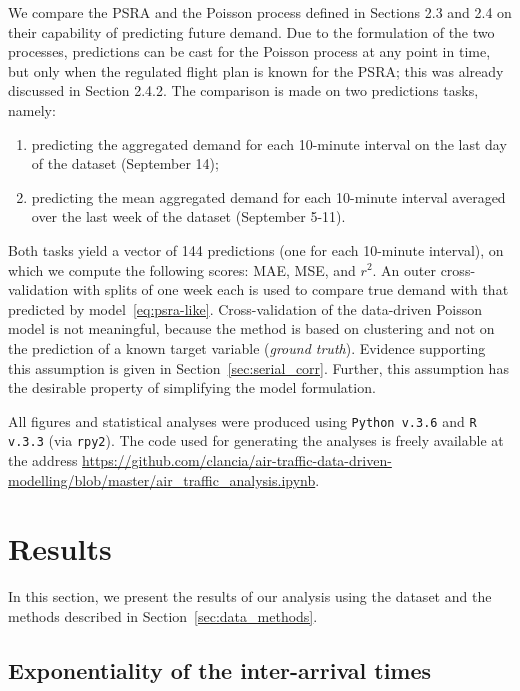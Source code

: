 \documentclass[draft,review]{elsarticle}
\begin{document}
We compare the \ac{PSRA} and the Poisson process defined in Sections 2.3 and 2.4 on their capability of predicting future demand. Due to the formulation of the two processes, predictions can be cast for the Poisson process at any point in time, but only when the regulated flight plan is known for the \ac{PSRA}; this was already discussed in Section 2.4.2.
The comparison is made on two predictions tasks, namely:
\begin{enumerate}
  \item predicting the aggregated demand for each 10-minute interval on the last day of the dataset (September 14);
  \item predicting the mean aggregated demand for each 10-minute interval averaged over the last week of the dataset (September 5-11).
\end{enumerate}
Both tasks yield a vector of 144 predictions (one for each 10-minute interval), on which we compute the following scores: \ac{MAE}, \ac{MSE}, and \(r^2\).
An outer cross-validation with splits of one week each is used to compare true demand with that predicted by model~\eqref{eq:psra-like}.
Cross-validation of the data-driven Poisson model is not meaningful, because the method is based on clustering and not on the prediction of a known target variable (\emph{ground truth}).
Evidence supporting this assumption is given in Section~\ref{sec:serial_corr}.
Further, this assumption has the desirable property of simplifying the model formulation.

All figures and statistical analyses were produced using \texttt{Python v.3.6} and \texttt{R v.3.3} (via \texttt{rpy2}). The code used for generating the analyses is freely available at the address \url{https://github.com/clancia/air-traffic-data-driven-modelling/blob/master/air_traffic_analysis.ipynb}.

\section{Results}\label{sec:results}

In this section, we present the results of our analysis using the dataset and the methods described in Section~\ref{sec:data_methods}.

\subsection{Exponentiality of the inter-arrival times}\label{sec:exp}
\end{document}
